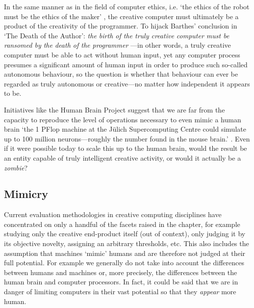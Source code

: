 In the same manner as in the field of computer ethics, i.e. `the ethics of the robot must be the ethics of the maker' \autocite{Mcbride2012}, the creative computer must ultimately be a product of the creativity of the programmer. To hijack Barthes' conclusion in `The Death of the Author': \emph{the birth of the truly creative computer must be ransomed by the death of the programmer} \autocite{Barthes1967}---in other words, a truly creative computer must be able to act without human input, yet any computer process presumes a significant amount of human input in order to produce such so-called autonomous behaviour, so the question is whether that behaviour can ever be regarded as truly autonomous or creative---no matter how independent it appears to be.

Initiatives like the Human Brain Project suggest that we are far from the capacity to reproduce the level of operations necessary to even mimic a human brain `the 1 PFlop machine at the J{\"u}lich Supercomputing Centre could simulate up to 100 million neurons---roughly the number found in the mouse brain.' \autocite{Walker2012}. Even if it were possible today to scale this up to the human brain, would the result be an entity capable of truly intelligent creative activity, or would it actually be a \emph{zombie}?


\subsection{Mimicry}

Current evaluation methodologies in creative computing disciplines have concentrated on only a handful of the facets raised in the  chapter, for example studying only the creative end-product itself (out of context), only judging it by its objective novelty, assigning an arbitrary thresholds, etc. This also includes the assumption that machines `mimic' humans and are therefore not judged at their full potential. For example we generally do not take into account the differences between humans and machines or, more precisely, the differences between the human brain and computer processors. In fact, it could be said that we are in danger of limiting computers in their vast potential so that they \emph{appear} more human.

